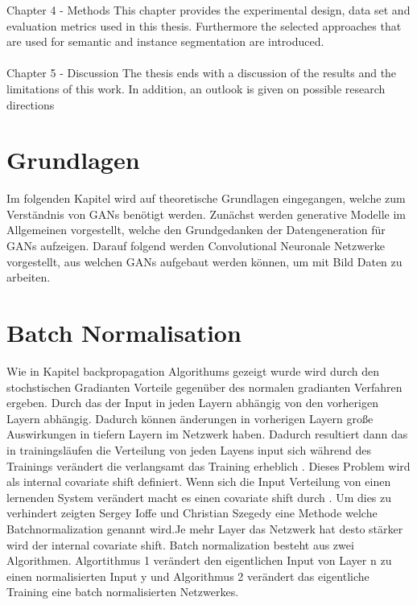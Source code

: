 \documentclass{llncs}
\begin{document}
Chapter 4 - Methods This chapter provides the experimental design, data set and evaluation metrics used in this thesis. Furthermore the selected approaches that are used for semantic and instance segmentation are introduced. 
\\\\
Chapter 5 - Discussion The thesis ends with a discussion of the results and the limitations of this work. In addition, an outlook is given on possible research directions

\section{Grundlagen}

Im folgenden Kapitel wird auf theoretische Grundlagen eingegangen, welche zum Verständnis von GANs benötigt werden. Zunächst werden  generative Modelle im Allgemeinen vorgestellt, welche den Grundgedanken der Datengeneration für GANs aufzeigen. Darauf folgend werden Convolutional Neuronale Netzwerke vorgestellt, aus welchen GANs aufgebaut werden können, um mit Bild Daten zu arbeiten.

\section{Batch Normalisation}

Wie in Kapitel backpropagation Algorithums gezeigt wurde wird durch den stochstischen Gradianten Vorteile gegenüber des normalen gradianten Verfahren ergeben. Durch das der Input in jeden Layern abhängig von den vorherigen Layern abhängig. Dadurch können änderungen in vorherigen Layern große Auswirkungen in tiefern Layern im Netzwerk haben.
Dadurch resultiert dann das in trainingsläufen die Verteilung von jeden Layens input sich während des Trainings verändert die verlangsamt das Training erheblich \cite{batchnorm}. Dieses Problem wird als internal covariate shift definiert. Wenn sich die Input Verteilung von einen lernenden System verändert macht es einen covariate shift durch \cite{batchnorm}. 
Um dies zu verhindert zeigten Sergey Ioffe und Christian Szegedy \cite{batchnorm} eine Methode welche Batchnormalization genannt wird.Je mehr Layer das Netzwerk hat desto stärker wird der internal covariate shift. Batch normalization besteht aus zwei Algorithmen. Algortithmus 1 verändert den eigentlichen Input von Layer n zu einen normalisierten Input y und Algorithmus 2 verändert das eigentliche Training eine batch normalisierten Netzwerkes.
\end{document}
